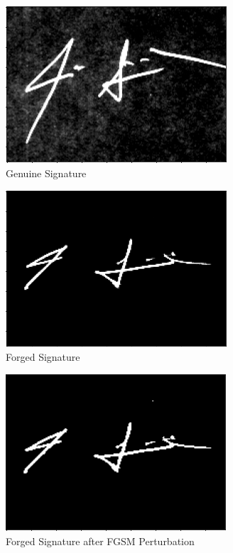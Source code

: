 \begin{figure}[h]
    \begin{center}
        \includegraphics[width=0.8\linewidth]{genuine.png}
    \end{center}
    \caption{Genuine Signature}
    \label{fig:genuine}
\end{figure}
\begin{figure}[h]
    \begin{center}
        \includegraphics[width=0.8\linewidth]{forge.png}
    \end{center}
    \caption{Forged Signature}
    \label{fig:forge}
\end{figure}
\begin{figure}[h]
    \begin{center}
        \includegraphics[width=0.8\linewidth]{improved_forge.png}
    \end{center}
    \caption{Forged Signature after FGSM Perturbation}
    \label{fig:improved_forge}
\end{figure}

